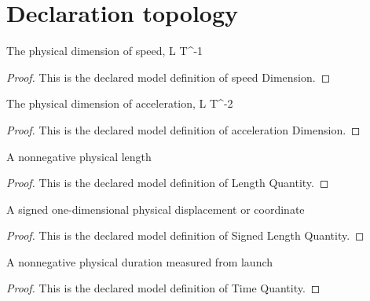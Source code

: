 \section{Declaration topology}
\begin{definition}
  \label{def:physics:phyx-mini-0685:phyxminiproblems-problemphyxmini0685-speeddimension}
  The physical dimension of speed, L T\textasciicircum{}-1
\end{definition}
\begin{proof}
  This is the declared model definition of speed Dimension.
\end{proof}
\begin{definition}
  \label{def:physics:phyx-mini-0685:phyxminiproblems-problemphyxmini0685-accelerationdimension}
  The physical dimension of acceleration, L T\textasciicircum{}-2
\end{definition}
\begin{proof}
  This is the declared model definition of acceleration Dimension.
\end{proof}
\begin{definition}
  \label{def:physics:phyx-mini-0685:phyxminiproblems-problemphyxmini0685-lengthquantity}
  A nonnegative physical length
\end{definition}
\begin{proof}
  This is the declared model definition of Length Quantity.
\end{proof}
\begin{definition}
  \label{def:physics:phyx-mini-0685:phyxminiproblems-problemphyxmini0685-signedlengthquantity}
  A signed one-dimensional physical displacement or coordinate
\end{definition}
\begin{proof}
  This is the declared model definition of Signed Length Quantity.
\end{proof}
\begin{definition}
  \label{def:physics:phyx-mini-0685:phyxminiproblems-problemphyxmini0685-timequantity}
  A nonnegative physical duration measured from launch
\end{definition}
\begin{proof}
  This is the declared model definition of Time Quantity.
\end{proof}
